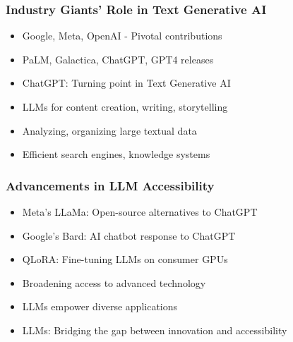 \begin{frame}[fragile]\frametitle{Industry Giants' Role in Text Generative AI}
    \begin{itemize}
        \item Google, Meta, OpenAI - Pivotal contributions
        \item PaLM, Galactica, ChatGPT, GPT4 releases
        \item ChatGPT: Turning point in Text Generative AI
        \item LLMs for content creation, writing, storytelling
        \item Analyzing, organizing large textual data
        \item Efficient search engines, knowledge systems
    \end{itemize}
\end{frame}

\begin{frame}[fragile]\frametitle{Advancements in LLM Accessibility}
    \begin{itemize}
        \item Meta's LLaMa: Open-source alternatives to ChatGPT
        \item Google's Bard: AI chatbot response to ChatGPT
        \item QLoRA: Fine-tuning LLMs on consumer GPUs
        \item Broadening access to advanced technology
        \item LLMs empower diverse applications
        \item LLMs: Bridging the gap between innovation and accessibility
    \end{itemize}
\end{frame}
